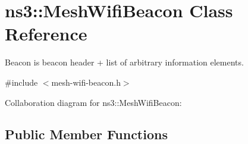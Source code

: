 \hypertarget{classns3_1_1MeshWifiBeacon}{}\section{ns3\+:\+:Mesh\+Wifi\+Beacon Class Reference}
\label{classns3_1_1MeshWifiBeacon}


Beacon is beacon header + list of arbitrary information elements.  




{\ttfamily \#include $<$mesh-\/wifi-\/beacon.\+h$>$}



Collaboration diagram for ns3\+:\+:Mesh\+Wifi\+Beacon\+:
\subsection*{Public Member Functions}
